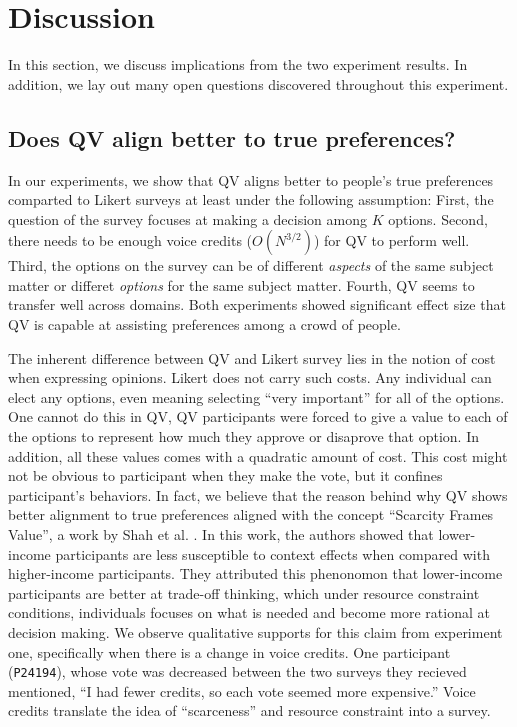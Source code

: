 \section{Discussion} \label{discussion}
In this section, we discuss implications from the two experiment results. In addition, we lay out many open questions discovered throughout this experiment.


\subsection{Does QV align better to true preferences?}
In our experiments, we show that QV aligns better to people's true preferences comparted to Likert surveys at least under the following assumption: First, the question of the survey focuses at making a decision among $K$ options. Second, there needs to be enough voice credits ($O(N^{3/2})$) for QV to perform well. Third, the options on the survey can be of different \textit{aspects} of the same subject matter or differet \textit{options} for the same subject matter. Fourth, QV seems to transfer well across domains. Both experiments showed significant effect size that QV is capable at assisting preferences among a crowd of people. 

The inherent difference between QV and Likert survey lies in the notion of cost when expressing opinions. Likert does not carry such costs. Any individual can elect any options, even meaning selecting ``very important'' for all of the options. One cannot do this in QV, QV participants were forced to give a value to each of the options to represent how much they approve or disaprove that option. In addition, all these values comes with a quadratic amount of cost. This cost might not be obvious to participant when they make the vote, but it confines participant's behaviors. In fact, we believe that the reason behind why QV shows better alignment to true preferences aligned with the concept ``Scarcity Frames Value'', a work by Shah et al. \cite{Shah2015a}. In this work, the authors showed that lower-income participants are less susceptible to context effects when compared with higher-income participants. They attributed this phenonomon that lower-income participants are better at trade-off thinking, which under resource constraint conditions, individuals focuses on what is needed and become more rational at decision making. We observe qualitative supports for this claim from experiment one, specifically when there is a change in voice credits. One participant (\texttt{P24194}), whose vote was decreased between the two surveys they recieved mentioned, ``I had fewer credits, so each vote seemed more expensive.'' Voice credits translate the idea of ``scarceness'' and resource constraint into a survey. 

